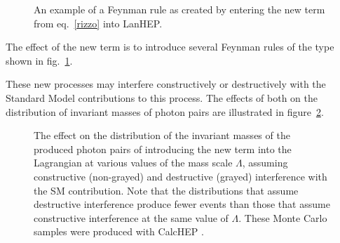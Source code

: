 \begin{figure}[htp]\begin{center}
{\footnotesize{}
}\end{center}
\caption{An example of a Feynman rule as created by entering the new term from eq.~\eqref{rizzo} into LanHEP\cite{lanhep}.\label{rule}}
\end{figure}

The effect of the new term is to introduce several Feynman rules of the type shown in fig.~\ref{rule}.

These new processes may interfere constructively or destructively with the Standard Model contributions to this process. The effects of both on the distribution of invariant masses of photon pairs are illustrated in figure~\ref{interf}.

\begin{figure}[htp]
\begin{minipage}[b]{.69\textwidth}
\begin{infilsf} \tiny \makebox[0pt][l]{
\hspace{-1em}
}\end{infilsf} \end{minipage}
\hfill\begin{minipage}[b]{.3\textwidth}
\caption{The effect on the distribution of the invariant masses of the produced photon pairs of introducing the new term into the Lagrangian at various values of the mass scale $\Lambda$, assuming constructive (non-grayed) and destructive (grayed) interference with the SM contribution. Note that the distributions that assume destructive interference produce fewer events than those that assume constructive interference at the same value of $\Lambda$. These Monte Carlo samples were produced with CalcHEP \cite{calchep}.
\label{interf}}
\end{minipage}
\end{figure}

